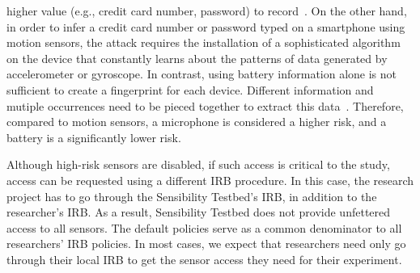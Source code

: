 higher value (e.g., credit card number, password) to record~\cite{zhang2015leave}. On the other 
hand, in order to infer a credit card number or password typed on a 
smartphone using motion sensors, the attack requires the installation of 
a sophisticated algorithm on the device that constantly learns about  
the patterns of data generated by accelerometer or gyroscope. In contrast,
using battery information alone is not sufficient to create a fingerprint 
for each device. Different information and mutiple occurrences need to
be pieced together to extract this data~\cite{battery-priv}. Therefore, 
compared to motion sensors, a microphone is considered a higher risk, 
and a battery is a significantly lower risk.

Although high-risk sensors are disabled, if such access  is critical to the 
study, access can be requested using a different IRB procedure. 
In this case, the research project has to go through the Sensibility 
Testbed's IRB, in addition to the researcher's IRB. 
 
%
%
As a result, Sensibility Testbed does not
provide unfettered access to all sensors. 
The default policies serve as a common denominator to all 
researchers' IRB policies. In most cases, we expect
that researchers need only go through their local IRB to get
the sensor access they need for their experiment. 
